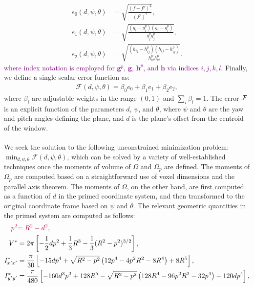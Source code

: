 \begin{align}
e_0(d,\psi,\theta) &=  \sqrt{\frac{(f - f^p)^2}{(f^p)^2}}, \\
e_1(d,\psi,\theta) &=  \sqrt{\frac{(g_i - g_i^p)(g_i - g_i^p)}{g_j^{p}g_j^{p}}}, \\
e_2(d,\psi,\theta) &=  \sqrt{\frac{(h_{ij} - h_{ij}^p)(h_{ij} - h_{ij}^p)}{h_{kl}^{p}h_{kl}^{p}}}.
\end{align}
\textcolor{purple}{where index notation is employed for $\bm{g}^p$, $\bm{g}$, $\bm{h}^p$, and $\bm{h}$ via indices $i,j,k,l$}. Finally, we define a single scalar error function as:
\begin{align}
\mathcal{F}(d,\psi,\theta) = \beta_0e_0 + \beta_1e_1 + \beta_2e_2,
\end{align}
where $\beta_i$ are adjustable weights in the range $(0,1)$ and $\sum \limits_i\beta_i = 1$.  The error $\mathcal{F}$ is an explicit function of the parameters $d$, $\psi$, and $\theta$, where $\psi$ and $\theta$ are the yaw and pitch angles defining the plane, and $d$ is the plane's offset from the centroid of the window.\\ \\ 
%
We seek the solution to the following unconstrained minimization problem: $\displaystyle \min_{d, \psi, \theta} \mathcal{F}(d,\psi,\theta)$, which can be solved by a variety of well-established techniques once the moments of volume of $\Omega$ and $\Omega_p$ are defined. The moments of $\Omega_p$ are computed based on a straightforward use of voxel dimensions and the parallel axis theorem. The moments of $\Omega$, on the other hand, are first computed as a function of $d$ in the primed coordinate system, and then transformed to the original coordinate frame based on $\psi$ and $\theta$. The relevant geometric quantities in the primed system are computed as follows:
\begin{align}
\color{purple}{p^2} &\color{purple}{= R^2 - d^2}\color{black}{,} \\
V^* &= 2\pi\left[-\frac{1}{2}dp^2 + \frac{1}{3}R^3 - \frac{1}{3}(R^2 - p^2)^{3/2} \right], \\
I^*_{x'x'} &= \frac{\pi}{30}\left[-15dp^4 + \sqrt{R^2-p^2}\left(12p^4 - 4p^2R^2 - 8R^4\right) + 8R^5 \right], \\
I^*_{y'y'} &= \frac{\pi}{480}\left[-160d^3p^2 + 128R^5 - \sqrt{R^2-p^2}\left(128R^4 - 96p^2R^2 - 32p^4\right) - 120dp^4 \right],
\end{align}
